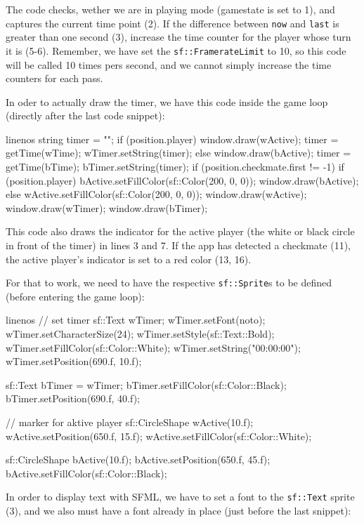 The code checks, wether we are in playing mode (gamestate is set to 1), and captures the current
time point (2).
If the difference between \texttt{now} and \texttt{last} is greater than one second (3), increase
the time counter for the player whose turn it is (5-6).
Remember, we have set the \texttt{sf::FramerateLimit} to 10, so this code will be called 10 times
pers second, and we cannot simply increase the time counters for each pass.

In oder to actually draw the timer, we have this code inside the game loop (directly after the
last code snippet):

\begin{cpp*}{linenos}
string timer = "";
if (position.player) {
  window.draw(wActive);
  timer = getTime(wTime);
  wTimer.setString(timer);
} else {
  window.draw(bActive);
  timer = getTime(bTime);
  bTimer.setString(timer);
}
if (position.checkmate.first != -1) {
  if (position.player) {
    bActive.setFillColor(sf::Color(200, 0, 0));
    window.draw(bActive);
  } else {
    wActive.setFillColor(sf::Color(200, 0, 0));
    window.draw(wActive);
  }
}
window.draw(wTimer);
window.draw(bTimer);
\end{cpp*}

This code also draws the indicator for the active player (the white or black circle in front of
the timer) in lines 3 and 7.
If the app has detected a checkmate (11), the active player's indicator is set to a red color
(13, 16).

For that to work, we need to have the respective \texttt{sf::Sprite}s to be defined (before
entering the game loop):

\begin{cpp*}{linenos}
// set timer
sf::Text wTimer;
wTimer.setFont(noto);
wTimer.setCharacterSize(24);
wTimer.setStyle(sf::Text::Bold);
wTimer.setFillColor(sf::Color::White);
wTimer.setString("00:00:00");
wTimer.setPosition(690.f, 10.f);

sf::Text bTimer = wTimer;
bTimer.setFillColor(sf::Color::Black);
bTimer.setPosition(690.f, 40.f);

// marker for aktive player
sf::CircleShape wActive(10.f);
wActive.setPosition(650.f, 15.f);
wActive.setFillColor(sf::Color::White);

sf::CircleShape bActive(10.f);
bActive.setPosition(650.f, 45.f);
bActive.setFillColor(sf::Color::Black);
\end{cpp*}

In order to display text with SFML, we have to set a font to the \texttt{sf::Text} sprite (3),
and we also must have a font already in place (just before the last snippet):

